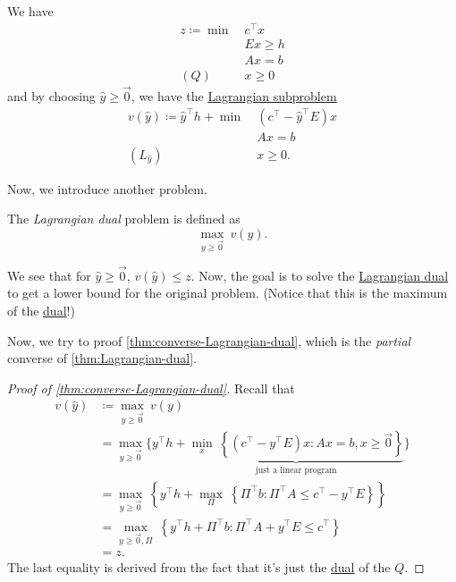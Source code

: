 \begin{prev}
	We have
	\[
		\begin{aligned}
			z\coloneqq \min~ & c^{\top}x \\
			                 & Ex \geq h \\
			                 & Ax = b    \\
			(Q)\quad         & x\geq 0
		\end{aligned}
	\]
	and by choosing \(\hat{y}\geq \vec{0}\), we have the \hyperref[def:Lagrangian-subproblem]{Lagrangian subproblem}
	\[
		\begin{aligned}
			v(\hat{y})\coloneqq \hat{y}^{\top}h + \min~ & (c^{\top} - \hat{y}^{\top}E)x \\
			                                            & Ax = b                        \\
			(L_{\hat{y}})\quad                          & x\geq 0.
		\end{aligned}
	\]
\end{prev}

Now, we introduce another problem.

\begin{definition}\label{def:Lagrangian-dual}
	The \emph{Lagrangian dual} problem is defined as
	\[
		\max_{y\geq \vec{0}}\ v(y).
	\]
\end{definition}

\begin{note}
	We see that for \(\hat{y}\geq \vec{0}\), \(v(\hat{y})\leq z\). Now, the goal is to solve the \hyperref[def:Lagrangian-dual]{Lagrangian dual} to get a lower bound for the original problem. (Notice that this is the maximum of the \hyperref[def:dual]{dual}!)
\end{note}

Now, we try to proof \autoref{thm:converse-Lagrangian-dual}, which is the \emph{partial} converse of \autoref{thm:Lagrangian-dual}.

\begin{proof}[Proof of \autoref{thm:converse-Lagrangian-dual}]
	Recall that
	\[
		\begin{split}
			v(\hat{y})&\coloneqq \max_{y\geq \vec{0}}\ v(y) \\
			&= \max_{y\geq \vec{0}} \Bigg\{y^{\top}h + \underbrace{\min_{x}\ \left\{(c^{\top} - y^{\top}E)x\colon Ax = b, x\geq \vec{0}\right\}}_{\text{just a linear program}}\Bigg\}\\
			&= \max_{y\geq \vec{0}}\ \left\{y^{\top}h + \max_{\Pi}\ \left\{\Pi^{\top}b\colon \Pi^{\top}A\leq c^{\top} - y^{\top}E\right\}\right\}\\
			&= \max_{y\geq \vec{0}, \Pi}\ \left\{y^{\top}h + \Pi^{\top}b\colon \Pi^{\top}A + y^{\top}E\leq c^{\top}\right\}\\
			&= z.
		\end{split}
	\]
	The last equality is derived from the fact that it's just the \hyperref[def:dual]{dual} of the \(Q\).
\end{proof}

